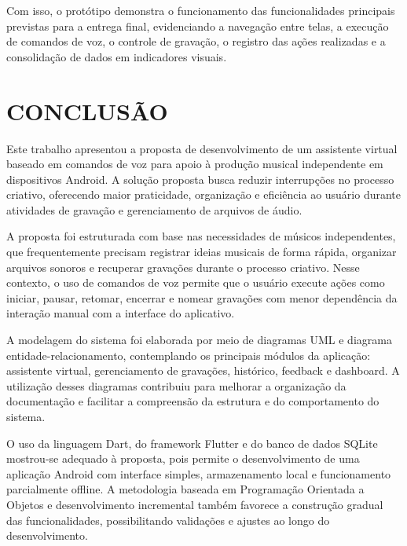 \documentclass[12pt,oneside,a4paper,brazil,final]{abntex2}
\begin{document}
Com isso, o protótipo demonstra o funcionamento das funcionalidades principais previstas para a entrega final, evidenciando a navegação entre telas, a execução de comandos de voz, o controle de gravação, o registro das ações realizadas e a consolidação de dados em indicadores visuais.






\chapter{CONCLUSÃO}



Este trabalho apresentou a proposta de desenvolvimento de um assistente virtual baseado em comandos de voz para apoio à produção musical independente em dispositivos Android. A solução proposta busca reduzir interrupções no processo criativo, oferecendo maior praticidade, organização e eficiência ao usuário durante atividades de gravação e gerenciamento de arquivos de áudio.



A proposta foi estruturada com base nas necessidades de músicos independentes, que frequentemente precisam registrar ideias musicais de forma rápida, organizar arquivos sonoros e recuperar gravações durante o processo criativo. Nesse contexto, o uso de comandos de voz permite que o usuário execute ações como iniciar, pausar, retomar, encerrar e nomear gravações com menor dependência da interação manual com a interface do aplicativo.



A modelagem do sistema foi elaborada por meio de diagramas UML e diagrama entidade-relacionamento, contemplando os principais módulos da aplicação: assistente virtual, gerenciamento de gravações, histórico, feedback e dashboard. A utilização desses diagramas contribuiu para melhorar a organização da documentação e facilitar a compreensão da estrutura e do comportamento do sistema.



O uso da linguagem Dart, do framework Flutter e do banco de dados SQLite mostrou-se adequado à proposta, pois permite o desenvolvimento de uma aplicação Android com interface simples, armazenamento local e funcionamento parcialmente offline. A metodologia baseada em Programação Orientada a Objetos e desenvolvimento incremental também favorece a construção gradual das funcionalidades, possibilitando validações e ajustes ao longo do desenvolvimento.
\end{document}
